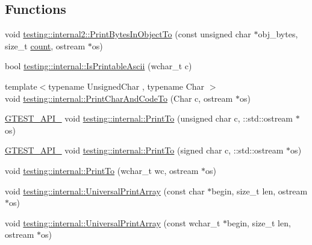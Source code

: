 \subsection*{Functions}
\begin{DoxyCompactItemize}
\item 
void \mbox{\hyperlink{namespacetesting_1_1internal2_abfb9aa80365f93b952e9a4bea09947a8}{testing\+::internal2\+::\+Print\+Bytes\+In\+Object\+To}} (const unsigned char $\ast$obj\+\_\+bytes, size\+\_\+t \mbox{\hyperlink{_obj__test_2lib_2googletest-release-1_88_81_2googlemock_2test_2gmock__stress__test_8cc_afd9db40e3361ae09188795e8cbe19752}{count}}, ostream $\ast$os)
\item 
bool \mbox{\hyperlink{namespacetesting_1_1internal_a744a6dd74c12d1e2c16b3c03e14ed4d4}{testing\+::internal\+::\+Is\+Printable\+Ascii}} (wchar\+\_\+t c)
\item 
{\footnotesize template$<$typename Unsigned\+Char , typename Char $>$ }\\void \mbox{\hyperlink{namespacetesting_1_1internal_a0c577e598e61d339ba45dd6643fb1969}{testing\+::internal\+::\+Print\+Char\+And\+Code\+To}} (Char c, ostream $\ast$os)
\item 
\mbox{\hyperlink{_obj__test_2lib_2googletest-release-1_88_81_2googletest_2include_2gtest_2internal_2gtest-port_8h_aa73be6f0ba4a7456180a94904ce17790}{G\+T\+E\+S\+T\+\_\+\+A\+P\+I\+\_\+}} void \mbox{\hyperlink{namespacetesting_1_1internal_ab7524d6d3ab8c31b1deea88bf61783bb}{testing\+::internal\+::\+Print\+To}} (unsigned char c, \+::std\+::ostream $\ast$os)
\item 
\mbox{\hyperlink{_obj__test_2lib_2googletest-release-1_88_81_2googletest_2include_2gtest_2internal_2gtest-port_8h_aa73be6f0ba4a7456180a94904ce17790}{G\+T\+E\+S\+T\+\_\+\+A\+P\+I\+\_\+}} void \mbox{\hyperlink{namespacetesting_1_1internal_ad453af399370e394881079c243abacb4}{testing\+::internal\+::\+Print\+To}} (signed char c, \+::std\+::ostream $\ast$os)
\item 
void \mbox{\hyperlink{namespacetesting_1_1internal_aa74ea9d64f76ce69eceb225ca5ebef58}{testing\+::internal\+::\+Print\+To}} (wchar\+\_\+t wc, ostream $\ast$os)
\item 
void \mbox{\hyperlink{namespacetesting_1_1internal_a070107e7a8205ad6ec4d538d52b15b38}{testing\+::internal\+::\+Universal\+Print\+Array}} (const char $\ast$begin, size\+\_\+t len, ostream $\ast$os)
\item 
void \mbox{\hyperlink{namespacetesting_1_1internal_a52394019018eb5079f9f1bcca23dcd60}{testing\+::internal\+::\+Universal\+Print\+Array}} (const wchar\+\_\+t $\ast$begin, size\+\_\+t len, ostream $\ast$os)

\end{DoxyCompactItemize}
